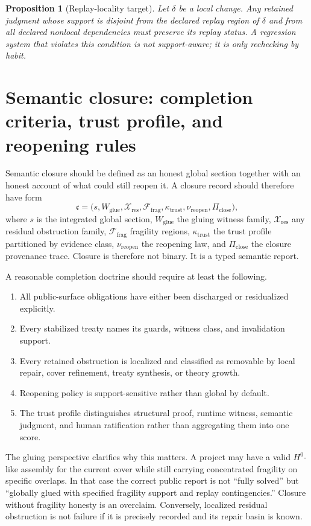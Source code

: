 \documentclass[11pt]{report}
\newtheorem{proposition}[definition]{Proposition}
\begin{document}
\begin{proposition}[Replay-locality target]
Let $\delta$ be a local change. Any retained judgment whose support is disjoint from the declared replay region of $\delta$ and from all declared nonlocal dependencies must preserve its replay status. A regression system that violates this condition is not support-aware; it is only rechecking by habit.
\end{proposition}

\section{Semantic closure: completion criteria, trust profile, and reopening rules}
Semantic closure should be defined as an honest global section together with an honest account of what could still reopen it. A closure record should therefore have form
\[
\mathfrak{c}
=
\bigl(
s,
W_{\mathrm{glue}},
\mathcal{X}_{\mathrm{res}},
\mathcal{F}_{\mathrm{frag}},
\kappa_{\mathrm{trust}},
\nu_{\mathrm{reopen}},
\Pi_{\mathrm{close}}
\bigr),
\]
where $s$ is the integrated global section, $W_{\mathrm{glue}}$ the gluing witness family, $\mathcal{X}_{\mathrm{res}}$ any residual obstruction family, $\mathcal{F}_{\mathrm{frag}}$ fragility regions, $\kappa_{\mathrm{trust}}$ the trust profile partitioned by evidence class, $\nu_{\mathrm{reopen}}$ the reopening law, and $\Pi_{\mathrm{close}}$ the closure provenance trace. Closure is therefore not binary. It is a typed semantic report.

A reasonable completion doctrine should require at least the following.
\begin{enumerate}
\item All public-surface obligations have either been discharged or residualized explicitly.
\item Every stabilized treaty names its guards, witness class, and invalidation support.
\item Every retained obstruction is localized and classified as removable by local repair, cover refinement, treaty synthesis, or theory growth.
\item Reopening policy is support-sensitive rather than global by default.
\item The trust profile distinguishes structural proof, runtime witness, semantic judgment, and human ratification rather than aggregating them into one score.
\end{enumerate}

The gluing perspective clarifies why this matters. A project may have a valid $H^0$-like assembly for the current cover while still carrying concentrated fragility on specific overlaps. In that case the correct public report is not ``fully solved'' but ``globally glued with specified fragility support and replay contingencies.'' Closure without fragility honesty is an overclaim. Conversely, localized residual obstruction is not failure if it is precisely recorded and its repair basin is known.
\end{document}
